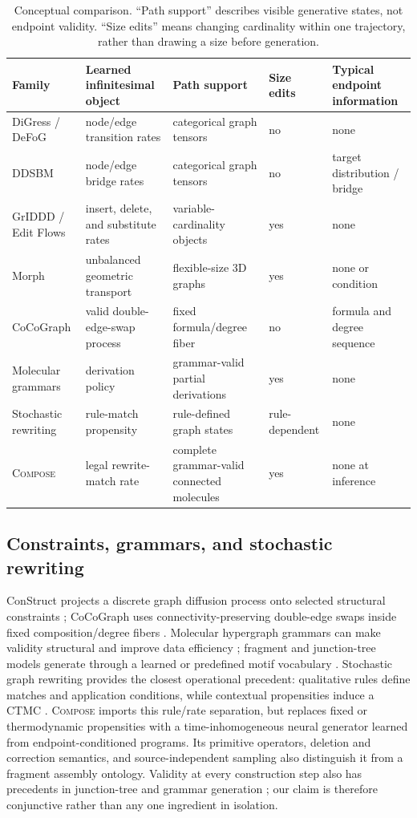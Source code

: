\documentclass{article}
\newcommand{\method}{\textsc{Compose}\xspace}
\theoremstyle{definition}
\theoremstyle{remark}
\begin{document}
\begin{table}[H]
\centering
\caption{Conceptual comparison. ``Path support'' describes visible generative states, not endpoint validity. ``Size edits'' means changing cardinality within one trajectory, rather than drawing a size before generation.}
\label{tab:positioning}
\small
\begin{tabularx}{\textwidth}{lYYYY}
\toprule
Family & Learned infinitesimal object & Path support & Size edits & Typical endpoint information\\
\midrule
DiGress / DeFoG & node/edge transition rates & categorical graph tensors & no & none\\
DDSBM & node/edge bridge rates & categorical graph tensors & no & target distribution / bridge\\
GrIDDD / Edit Flows & insert, delete, and substitute rates & variable-cardinality objects & yes & none\\
Morph & unbalanced geometric transport & flexible-size 3D graphs & yes & none or condition\\
CoCoGraph & valid double-edge-swap process & fixed formula/degree fiber & no & formula and degree sequence\\
Molecular grammars & derivation policy & grammar-valid partial derivations & yes & none\\
Stochastic rewriting & rule-match propensity & rule-defined graph states & rule-dependent & none\\
\midrule
\method & legal rewrite-match rate & complete grammar-valid connected molecules & yes & none at inference\\
\bottomrule
\end{tabularx}
\end{table}

\subsection{Constraints, grammars, and stochastic rewriting}

ConStruct projects a discrete graph diffusion process onto selected structural constraints \citep{madeira2024construct}; CoCoGraph uses connectivity-preserving double-edge swaps inside fixed composition/degree fibers \citep{ruizbotella2026cocograph}. Molecular hypergraph grammars can make validity structural and improve data efficiency \citep{kajino2019mhg,guo2022grammar}; fragment and junction-tree models generate through a learned or predefined motif vocabulary \citep{jin2018jtvae}. Stochastic graph rewriting provides the closest operational precedent: qualitative rules define matches and application conditions, while contextual propensities induce a CTMC \citep{danos2015thermodynamic,behr2021rewriting}. \method imports this rule/rate separation, but replaces fixed or thermodynamic propensities with a time-inhomogeneous neural generator learned from endpoint-conditioned programs. Its primitive operators, deletion and correction semantics, and source-independent sampling also distinguish it from a fragment assembly ontology. Validity at every construction step also has precedents in junction-tree and grammar generation \citep{jin2018jtvae,kajino2019mhg}; our claim is therefore conjunctive rather than any one ingredient in isolation.
\end{document}
